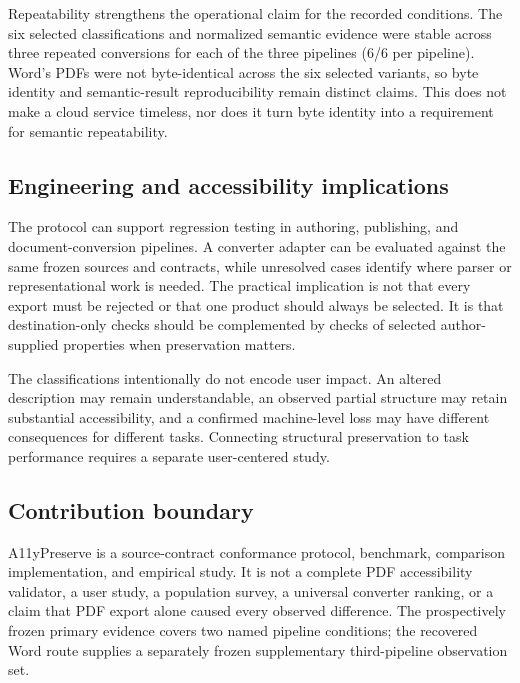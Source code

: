 Repeatability strengthens the operational claim for the recorded conditions. The six selected classifications and normalized semantic evidence were stable across three repeated conversions for each of the three pipelines (6/6 per pipeline). Word's PDFs were not byte-identical across the six selected variants, so byte identity and semantic-result reproducibility remain distinct claims. This does not make a cloud service timeless, nor does it turn byte identity into a requirement for semantic repeatability.

\subsection{Engineering and accessibility implications}
The protocol can support regression testing in authoring, publishing, and document-conversion pipelines. A converter adapter can be evaluated against the same frozen sources and contracts, while unresolved cases identify where parser or representational work is needed. The practical implication is not that every export must be rejected or that one product should always be selected. It is that destination-only checks should be complemented by checks of selected author-supplied properties when preservation matters.

The classifications intentionally do not encode user impact. An altered description may remain understandable, an observed partial structure may retain substantial accessibility, and a confirmed machine-level loss may have different consequences for different tasks. Connecting structural preservation to task performance requires a separate user-centered study.

\subsection{Contribution boundary}
A11yPreserve is a source-contract conformance protocol, benchmark, comparison implementation, and empirical study. It is not a complete PDF accessibility validator, a user study, a population survey, a universal converter ranking, or a claim that PDF export alone caused every observed difference. The prospectively frozen primary evidence covers two named pipeline conditions; the recovered Word route supplies a separately frozen supplementary third-pipeline observation set.
